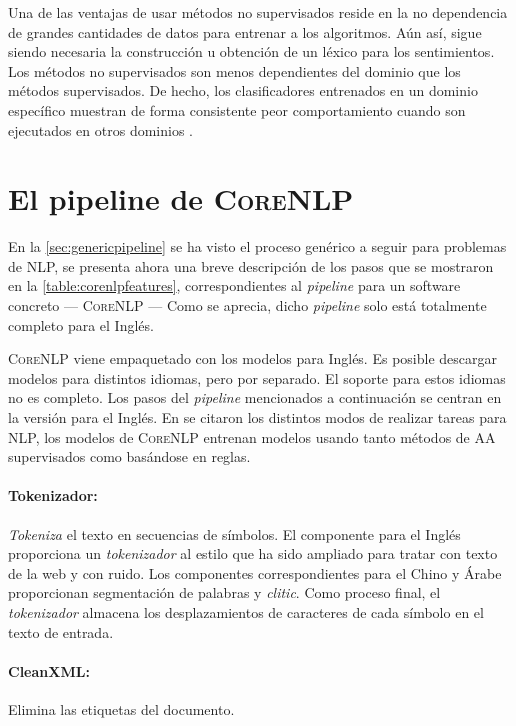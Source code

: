 Una de las ventajas de usar métodos no supervisados reside en la no dependencia
de grandes cantidades de datos para entrenar a los algoritmos. Aún así, sigue
siendo necesaria la construcción u obtención de un léxico para los
sentimientos. Los métodos no supervisados son menos dependientes del dominio que
los métodos supervisados. De hecho, los clasificadores entrenados en un dominio
específico muestran de forma consistente peor comportamiento cuando son
ejecutados en otros dominios \cite{anthony2005}.


\section{El pipeline de \textsc{CoreNLP}}
\label{sec:corenlppipeline}

En la \autoref{sec:genericpipeline} se ha visto el proceso genérico a seguir
para problemas de \ac{NLP}, se presenta ahora una breve descripción de
los pasos que se mostraron en la \autoref{table:corenlpfeatures},
correspondientes al \emph{pipeline} para un software concreto ---
\textsc{CoreNLP} \cite{Manning2014} --- Como se aprecia, dicho \emph{pipeline}
solo está totalmente completo para el Inglés.

\textsc{CoreNLP} viene empaquetado con los modelos para Inglés. Es posible
descargar modelos para distintos idiomas, pero por separado. El soporte para
estos idiomas no es completo. Los pasos del \emph{pipeline} mencionados a
continuación se centran en la versión para el Inglés. En
 se citaron los distintos modos de realizar tareas para
\ac{NLP}, los modelos de \textsc{CoreNLP} entrenan modelos usando tanto métodos
de \ac{AA} supervisados como basándose en reglas.

\paragraph{Tokenizador:} \emph{Tokeniza} el texto en secuencias de símbolos. El
componente para el Inglés proporciona un \emph{tokenizador} al estilo
 que ha sido ampliado para tratar con texto de la web y
con ruido. Los componentes correspondientes para el Chino y Árabe proporcionan
segmentación de palabras y \emph{clitic}. Como proceso final, el
\emph{tokenizador} almacena los desplazamientos de caracteres de cada símbolo en
el texto de entrada.

\paragraph{CleanXML:} Elimina las etiquetas  del documento.

